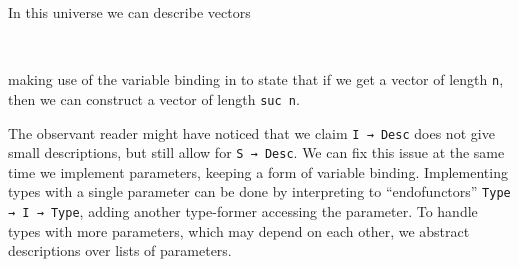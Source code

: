 In this universe we can describe vectors
\begin{code}%
%
\>[2]\AgdaSpace{}%
\AgdaSymbol{:}\AgdaSpace{}%
\AgdaSpace{}%
\AgdaSpace{}%
\AgdaSpace{}%
\<%
\\
%
\>[2]\AgdaSpace{}%
\AgdaSpace{}%
\AgdaSymbol{=}\AgdaSpace{}%
\AgdaSymbol{(}\AgdaSpace{}%
\AgdaSymbol{)}\AgdaSpace{}%
\AgdaSpace{}%
\AgdaSymbol{(}\AgdaSpace{}%
\AgdaSpace{}%
\AgdaSpace{}%
\AgdaSpace{}%
\AgdaSpace{}%
\AgdaSpace{}%
\AgdaSpace{}%
\AgdaSpace{}%
\AgdaBound{\AgdaUnderscore{}}\AgdaSpace{}%
\AgdaSpace{}%
\AgdaSpace{}%
\AgdaSpace{}%
\AgdaSymbol{(}\AgdaSpace{}%
\AgdaSymbol{(}\AgdaSpace{}%
\AgdaSymbol{)))}\<%
\end{code}
making use of the variable binding in  to state that if we get a vector of length \texttt{n}, then we can construct a vector of length \texttt{suc n}.

The observant reader might have noticed that we claim \texttt{I → Desc} does not give small descriptions, but still allow for \texttt{S → Desc}. We can fix this issue at the same time we implement parameters, keeping a form of variable binding. Implementing types with a single parameter can be done by interpreting to ``endofunctors'' \texttt{Type → I → Type}, adding another type-former accessing the parameter. To handle types with more parameters, which may depend on each other, we abstract descriptions over lists of parameters.

